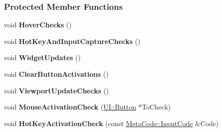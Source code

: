 \subsubsection*{Protected Member Functions}
\begin{DoxyCompactItemize}
\item 
\hypertarget{classphys_1_1UIManager_ae5beaafe73c68d39eb84463033941057}{
void {\bfseries HoverChecks} ()}
\label{d5/dc5/classphys_1_1UIManager_ae5beaafe73c68d39eb84463033941057}

\item 
\hypertarget{classphys_1_1UIManager_aafbc4428f35b8ec2be7cff6fd0b534d1}{
void {\bfseries HotKeyAndInputCaptureChecks} ()}
\label{d5/dc5/classphys_1_1UIManager_aafbc4428f35b8ec2be7cff6fd0b534d1}

\item 
\hypertarget{classphys_1_1UIManager_aefbf6f02f0b1049c321139fa399eb7ee}{
void {\bfseries WidgetUpdates} ()}
\label{d5/dc5/classphys_1_1UIManager_aefbf6f02f0b1049c321139fa399eb7ee}

\item 
\hypertarget{classphys_1_1UIManager_a6ad508c48abf98bfccf3d04cd46d4f77}{
void {\bfseries ClearButtonActivations} ()}
\label{d5/dc5/classphys_1_1UIManager_a6ad508c48abf98bfccf3d04cd46d4f77}

\item 
\hypertarget{classphys_1_1UIManager_aba919b3f29058271e4681f9ca7a8a17e}{
void {\bfseries ViewportUpdateChecks} ()}
\label{d5/dc5/classphys_1_1UIManager_aba919b3f29058271e4681f9ca7a8a17e}

\item 
\hypertarget{classphys_1_1UIManager_af1e9285e30826b1c075bb8ca17fcc31e}{
void {\bfseries MouseActivationCheck} (\hyperlink{classphys_1_1UI_1_1Button}{UI::Button} $\ast$ToCheck)}
\label{d5/dc5/classphys_1_1UIManager_af1e9285e30826b1c075bb8ca17fcc31e}

\item 
\hypertarget{classphys_1_1UIManager_a8340da0109e0c473af342ab4a514afc2}{
void {\bfseries HotKeyActivationCheck} (const \hyperlink{classphys_1_1MetaCode_a3e501cbb5bf0f6f1fdb7211465bda8d8}{MetaCode::InputCode} \&Code)}
\label{d5/dc5/classphys_1_1UIManager_a8340da0109e0c473af342ab4a514afc2}

\end{DoxyCompactItemize}

